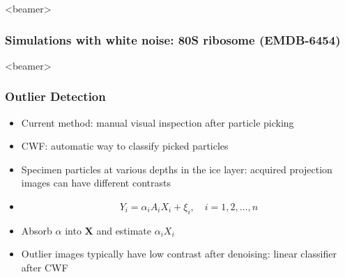 \documentclass{beamer}
\begin{document}
\begin{frame}<beamer>
\frametitle{Simulations with white noise:  80S ribosome (EMDB-6454)}

\begin{figure}[]
\centering
{}
\vspace{-0.5mm}
\vspace{-0.5mm}
\vspace{-0.5mm}

\label{fig:ims_6454}
\end{figure}

\end{frame}


\begin{frame}<beamer>
\frametitle{Outlier Detection}
\begin{itemize}[]
 \item  Current method: manual visual inspection after particle picking
\item CWF: automatic way to classify picked particles
\item Specimen particles at various depths in the ice layer: acquired
projection images can have different contrasts
\item 
\begin{equation}
 Y_i = \alpha_i A_i X_i + \xi_i, \quad i=1,2,\ldots,n
\label{eqn:contrast}
\end{equation}
\item Absorb $\alpha$ into $\textbf{X}$ and estimate $\alpha_i X_i$ 
\item  Outlier images typically have low contrast
after denoising: linear classifier
after CWF 
\end{itemize}
\end{frame}
\end{document}

